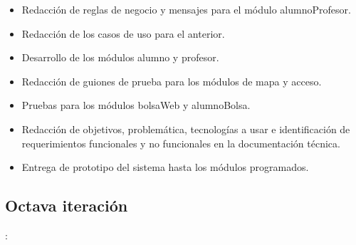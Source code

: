 \begin{itemize}
	\item Redacción de reglas de negocio y mensajes para el módulo alumnoProfesor.
	\item Redacción de los casos de uso para el anterior.
	\item Desarrollo de los módulos alumno y profesor.
	\item Redacción de guiones de prueba para los módulos de mapa y acceso.
	\item Pruebas para los módulos bolsaWeb y alumnoBolsa.
	\item Redacción de objetivos, problemática, tecnologías a usar e identificación de requerimientos funcionales y no funcionales en la documentación técnica.
	\item Entrega de prototipo del sistema hasta los módulos programados.
\end{itemize}


\subsection{Octava iteración}: 

